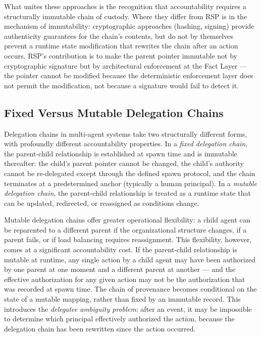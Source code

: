 What unites these approaches is the recognition that accountability requires a structurally immutable chain of custody. Where they differ from RSP is in the mechanism of immutability: cryptographic approaches (hashing, signing) provide authenticity guarantees for the chain's contents, but do not by themselves prevent a runtime state modification that rewrites the chain after an action occurs. RSP's contribution is to make the parent pointer immutable not by cryptographic signature but by architectural enforcement at the Fact Layer — the pointer cannot be modified because the deterministic enforcement layer does not permit the modification, not because a signature would fail to detect it.

\subsection{Fixed Versus Mutable Delegation Chains}

Delegation chains in multi-agent systems take two structurally different forms, with profoundly different accountability properties. In a \emph{fixed delegation chain}, the parent-child relationship is established at spawn time and is immutable thereafter: the child's parent pointer cannot be changed, the child's authority cannot be re-delegated except through the defined spawn protocol, and the chain terminates at a predetermined anchor (typically a human principal). In a \emph{mutable delegation chain}, the parent-child relationship is treated as a runtime state that can be updated, redirected, or reassigned as conditions change.

Mutable delegation chains offer greater operational flexibility: a child agent can be reparented to a different parent if the organizational structure changes, if a parent fails, or if load balancing requires reassignment. This flexibility, however, comes at a significant accountability cost. If the parent-child relationship is mutable at runtime, any single action by a child agent may have been authorized by one parent at one moment and a different parent at another — and the effective authorization for any given action may not be the authorization that was recorded at spawn time. The chain of provenance becomes conditional on the state of a mutable mapping, rather than fixed by an immutable record. This introduces the \emph{delegatee ambiguity problem}: after an event, it may be impossible to determine which principal effectively authorized the action, because the delegation chain has been rewritten since the action occurred.

